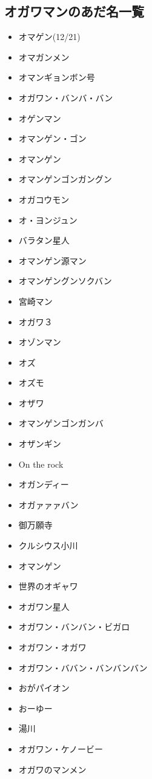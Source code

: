 \documentclass[12pt]{jsarticle}
\begin{document}
\subsection{オガワマンのあだ名一覧}
\begin{itemize}
\item オマゲン(12/21)
\item オマガンメン
\item オマンギョンボン号
\item オガワン・バンバ・バン
\item オゲンマン
\item オマンゲン・ゴン
\item オマンゲン
\item オマンゲンゴンガングン
\item オガコウモン
\item オ・ヨンジュン
\item バラタン星人
\item オマンゲン源マン
\item オマンゲングンソクバン
\item 宮崎マン
\item オガワ３
\item オゾンマン
\item オズ
\item オズモ
\item オザワ
\item オマンゲンゴンガンバ
\item オザンギン
\item On the rock
\item オガンディー
\item オガァァァバン
\item 御万願寺
\item クルシウス小川
\item オマンゲン
\item 世界のオギャワ
\item オガワン星人
\item オガワン・バンバン・ビガロ
\item オガワン・オガワ
\item オガワン・ババン・バンバンバン
\item おがパイオン
\item おーゆー
\item 湯川
\item オガワン・ケノービー
\item オガワのマンメン
\end{itemize}

\newpage
\end{document}
